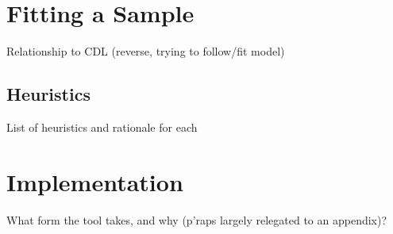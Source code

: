 % 
% 
% 
% 
% 


\section{Fitting a Sample}
Relationship to CDL (reverse, trying to follow/fit model)

\subsection{Heuristics}
List of heuristics and rationale for each

\section{Implementation}
What form the tool takes, and why (p'raps largely relegated to an appendix)?


